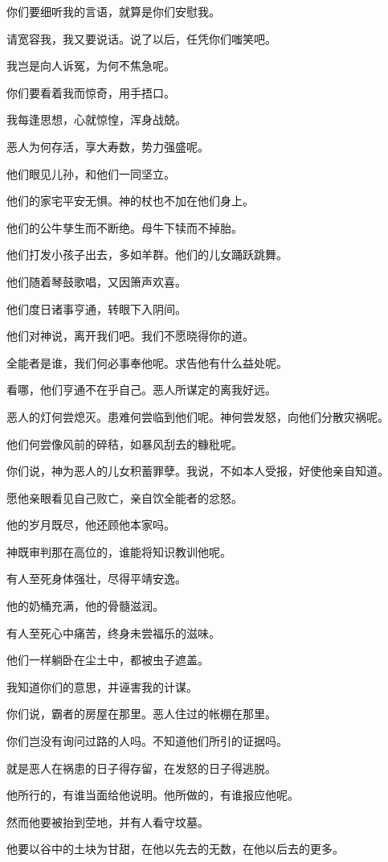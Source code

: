 \documentclass[12pt,oneside]{book}
\begin{document}
你们要细听我的言语，就算是你们安慰我。

请宽容我，我又要说话。说了以后，任凭你们嗤笑吧。

我岂是向人诉冤，为何不焦急呢。

你们要看着我而惊奇，用手捂口。

我每逢思想，心就惊惶，浑身战兢。

恶人为何存活，享大寿数，势力强盛呢。

他们眼见儿孙，和他们一同坚立。

他们的家宅平安无惧。神的杖也不加在他们身上。

他们的公牛孳生而不断绝。母牛下犊而不掉胎。

他们打发小孩子出去，多如羊群。他们的儿女踊跃跳舞。

他们随着琴鼓歌唱，又因箫声欢喜。

他们度日诸事亨通，转眼下入阴间。

他们对神说，离开我们吧。我们不愿晓得你的道。

全能者是谁，我们何必事奉他呢。求告他有什么益处呢。

看哪，他们亨通不在乎自己。恶人所谋定的离我好远。

恶人的灯何尝熄灭。患难何尝临到他们呢。神何尝发怒，向他们分散灾祸呢。

他们何尝像风前的碎秸，如暴风刮去的糠秕呢。

你们说，神为恶人的儿女积蓄罪孽。我说，不如本人受报，好使他亲自知道。

愿他亲眼看见自己败亡，亲自饮全能者的忿怒。

他的岁月既尽，他还顾他本家吗。

神既审判那在高位的，谁能将知识教训他呢。

有人至死身体强壮，尽得平靖安逸。

他的奶桶充满，他的骨髓滋润。

有人至死心中痛苦，终身未尝福乐的滋味。

他们一样躺卧在尘土中，都被虫子遮盖。

我知道你们的意思，并诬害我的计谋。

你们说，霸者的房屋在那里。恶人住过的帐棚在那里。

你们岂没有询问过路的人吗。不知道他们所引的证据吗。

就是恶人在祸患的日子得存留，在发怒的日子得逃脱。

他所行的，有谁当面给他说明。他所做的，有谁报应他呢。

然而他要被抬到茔地，并有人看守坟墓。

他要以谷中的土块为甘甜，在他以先去的无数，在他以后去的更多。
\end{document}
